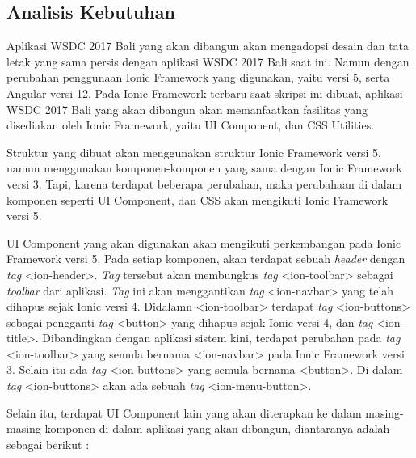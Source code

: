 \subsection{Analisis Kebutuhan}
\label{sec:analisisKebutuhanSistem}
Aplikasi WSDC 2017 Bali yang akan dibangun akan mengadopsi desain dan tata letak yang sama persis dengan aplikasi WSDC 2017 Bali saat ini. Namun dengan perubahan penggunaan Ionic Framework yang digunakan, yaitu versi 5, serta Angular versi 12. Pada Ionic Framework terbaru saat skripsi ini dibuat, aplikasi WSDC 2017 Bali yang akan dibangun akan memanfaatkan fasilitas yang disediakan oleh Ionic Framework, yaitu UI Component, dan CSS Utilities. 

Struktur yang dibuat akan menggunakan struktur Ionic Framework versi 5, namun menggunakan komponen-komponen yang sama dengan Ionic Framework versi 3. Tapi, karena terdapat beberapa perubahan, maka perubahaan di dalam komponen seperti UI Component, dan CSS akan mengikuti Ionic Framework versi 5. 

UI Component yang akan digunakan akan mengikuti perkembangan pada Ionic Framework versi 5. Pada setiap komponen, akan terdapat sebuah \textit{header} dengan \textit{tag} <ion-header>. \textit{Tag} tersebut akan membungkus \textit{tag} <ion-toolbar> sebagai \textit{toolbar} dari aplikasi. \textit{Tag} ini akan menggantikan \textit{tag} <ion-navbar> yang telah dihapus sejak Ionic versi 4. Didalamn <ion-toolbar> terdapat \textit{tag} <ion-buttons> sebagai pengganti \textit{tag} <button> yang dihapus sejak Ionic versi 4, dan \textit{tag} <ion-title>. Dibandingkan dengan aplikasi sistem kini, terdapat perubahan pada \textit{tag} <ion-toolbar> yang semula bernama <ion-navbar> pada Ionic Framework versi 3. Selain itu ada \textit{tag} <ion-buttons> yang semula bernama <button>. Di dalam \textit{tag} <ion-buttons> akan ada sebuah \textit{tag} <ion-menu-button>.

Selain itu, terdapat UI Component lain yang akan diterapkan ke dalam masing-masing komponen di dalam aplikasi yang akan dibangun, diantaranya adalah sebagai berikut :

